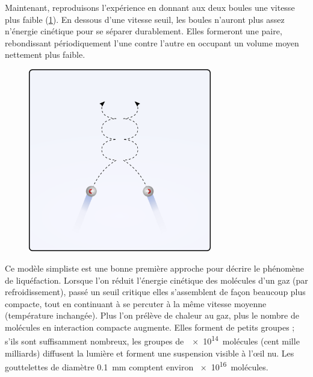 		Maintenant, reproduisons l’expérience en donnant aux deux boules une vitesse plus faible (\cref{fig_billard_faible_vitesse}). En dessous d’une vitesse seuil, les boules n’auront plus assez n’énergie cinétique pour se séparer durablement. Elles formeront une paire, rebondissant périodiquement l’une contre l’autre en occupant un volume moyen nettement plus faible.
		
		\begin{figure}
			\begin{center}
				\includegraphics[width=8cm]{images/billard_lent.png}
			\end{center}
  		\label{fig_billard_faible_vitesse}
		\end{figure}

		Ce modèle simpliste est une bonne première approche pour décrire le phénomène de liquéfaction. Lorsque l’on réduit l’énergie cinétique des molécules d’un gaz (par refroidissement), passé un seuil critique elles s’assemblent de façon beaucoup plus compacte, tout en continuant à se percuter à la même vitesse moyenne (température inchangée). Plus l’on prélève de chaleur au gaz, plus le nombre de molécules en interaction compacte augmente. Elles forment de petits groupes ; s’ils sont suffisamment nombreux, les groupes de~\num{e14}~molécules (cent mille milliards) diffusent la lumière et forment une suspension visible à l’œil nu. Les gouttelettes de diamètre \SI{0,1}{\milli\metre} comptent environ \num{e16}~molécules.

		
